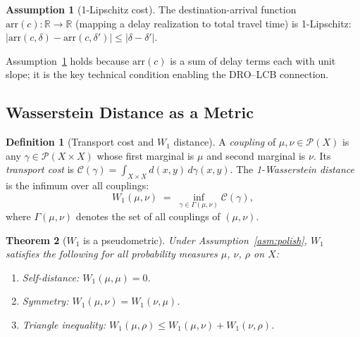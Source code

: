 \documentclass[11pt]{article}
\newtheorem{theorem}{Theorem}
\theoremstyle{definition}
\newtheorem{definition}[theorem]{Definition}
\newtheorem{assumption}{Assumption}
\theoremstyle{remark}
\begin{document}
\begin{assumption}[1-Lipschitz cost]\label{asm:lip}
The destination-arrival function $\mathrm{arr}(c):\mathbb{R} \to \mathbb{R}$
(mapping a delay realization to total travel time) is 1-Lipschitz:
$|\mathrm{arr}(c,\delta) - \mathrm{arr}(c,\delta')| \leq |\delta - \delta'|$.
\end{assumption}

\noindent Assumption~\ref{asm:lip} holds because $\mathrm{arr}(c)$ is a sum
of delay terms each with unit slope; it is the key technical
condition enabling the DRO--LCB connection.

\subsection{Wasserstein Distance as a Metric}

\begin{definition}[Transport cost and $W_1$ distance]\label{def:w1}
A \emph{coupling} of $\mu, \nu \in \mathcal{P}(X)$ is any
$\gamma \in \mathcal{P}(X \times X)$ whose first marginal is $\mu$ and
second marginal is $\nu$.
Its \emph{transport cost} is
$\mathcal{C}(\gamma) = \int_{X \times X} d(x,y)\,d\gamma(x,y)$.
The \emph{1-Wasserstein distance} is the infimum over all couplings:
\[
W_1(\mu,\nu) \;=\; \inf_{\gamma \in \Gamma(\mu,\nu)} \mathcal{C}(\gamma),
\]
where $\Gamma(\mu,\nu)$ denotes the set of all couplings of $(\mu,\nu)$.
\end{definition}

\begin{theorem}[$W_1$ is a pseudometric]\label{thm:w1_metric}
Under Assumption~\ref{asm:polish}, $W_1$ satisfies the following
for all probability measures $\mu$, $\nu$, $\rho$ on $X$:
\begin{enumerate}[label=(\roman*)]
\item \emph{Self-distance:} $W_1(\mu,\mu) = 0$.
\item \emph{Symmetry:} $W_1(\mu,\nu) = W_1(\nu,\mu)$.
\item \emph{Triangle inequality:} $W_1(\mu,\rho) \leq W_1(\mu,\nu) + W_1(\nu,\rho)$.
\end{enumerate}
\end{theorem}
\end{document}

